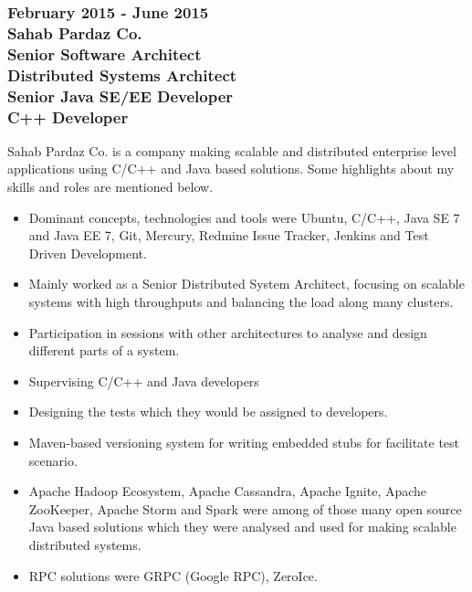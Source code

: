 \documentclass[10pt,a4paper]{article}
\begin{document}
\subsubsection{\textnormal {February 2015 - June 2015} \\ \textnormal {Sahab Pardaz Co.} \\ Senior Software Architect \\ Distributed Systems Architect \\ Senior Java SE/EE Developer \\ C++ Developer}
	\setlength{\leftskip}{0.5cm}
  \setlength{\rightskip}{1cm}
  Sahab Pardaz Co. is a company making scalable and distributed enterprise level applications using C/C++ and Java based solutions. Some highlights about my skills and roles are mentioned below.
  \begin{itemize}
    \setlength{\rightskip}{2cm}
    \setlength\itemsep{0em}
    \item \small Dominant concepts, technologies and tools were Ubuntu, C/C++, Java SE 7 and Java EE 7, Git, Mercury, Redmine Issue Tracker, Jenkins and Test Driven Development.
    \item \small Mainly worked as a Senior Distributed System Architect, focusing on scalable systems with high throughputs and balancing the load along many clusters.
    \item \small Participation in sessions with other architectures to analyse and design different parts of a system.
    \item \small Supervising C/C++ and Java developers
    \item \small Designing the tests which they would be assigned to developers.
    \item \small Maven-based versioning system for writing embedded stubs for facilitate test scenario.
    \item \small Apache Hadoop Ecosystem, Apache Cassandra, Apache Ignite, Apache ZooKeeper, Apache Storm and Spark were among of those many open source Java based solutions which they were analysed and used for making scalable distributed systems.
    \item \small RPC solutions were GRPC (Google RPC), ZeroIce.
  \end{itemize}
  \setlength{\leftskip}{0pt}
  \setlength{\rightskip}{0cm}
	  
\end{document}
